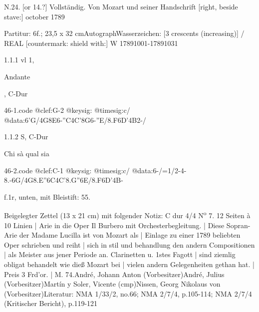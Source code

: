 \documentclass[a4paper, twocolumn, 11pt]{book}
\begin{document}
\par \begin{itshape} N.24. [or {\textquotedbl}14.{\textquotedbl}?] Vollständig. Von Mozart und seiner Handschrift [right, beside stave:] october 1789\end{itshape} 
\par \textcolor{darkblue}{}  Partitur: 6f.; 23,5 x 32 cm\newline Autograph\newline Wasserzeichen: [3 crescents (increasing)] / REAL [countermark: shield with:] W  17891001-17891031
\par 1.1.1  vl 1, \begin{itshape}Andante\end{itshape}, C-Dur  
\begin{filecontents*}{46-1.code}
@clef:G-2
@keysig:
@timesig:c/
@data:6'G/4G{8E6-''C}4C'{8G6-''E}/{8.F6D}'4B2-/
\end{filecontents*}
\newline %
\par 1.1.2  S, C-Dur\newline \begin{footnotesize} Chi sà qual sia \end{footnotesize}  
\begin{filecontents*}{46-2.code}
@clef:C-1
@keysig:
@timesig:c/
@data:6-/=1/2-4-8.-6G/4G8.E''6C4C'8.G''6E/{8.F6D}'4B-
\end{filecontents*}
\newline %
\par f.1r, unten, mit Bleistift: {\textquotedbl}55.{\textquotedbl}
\par Beigelegter Zettel (13 x 21 cm) mit folgender Notiz: C dur 4/4 N\textsuperscript{o} 7. 12 Seiten à 10 Linien | Arie in die Oper Il Burbero mit Orchesterbegleitung. | Diese Sopran-Arie der Madame Lucilla ist von Mozart als | Einlage zu einer 1789 beliebten Oper schrieben und reiht | sich in stil und behandlung den andern Compositionen | als Meister aus jener Periode an. Clarinetten u. 1stes Fagott | sind ziemlig obligat behandelt wie dieß Mozart bei | vielen andern Gelegenheiten gethan hat. | Preis 3 Frd'or. | M. 74.\newline André, Johann Anton  (Vorbesitzer)\newline André, Julius  (Vorbesitzer)\newline Martín y Soler, Vicente  (cmp)\newline Nissen, Georg Nikolaus von  (Vorbesitzer)\newline Literatur: NMA  1/33/2, no.66; NMA  2/7/4, p.105-114; NMA  2/7/4 (Kritischer Bericht), p.119-121
\end{document}
